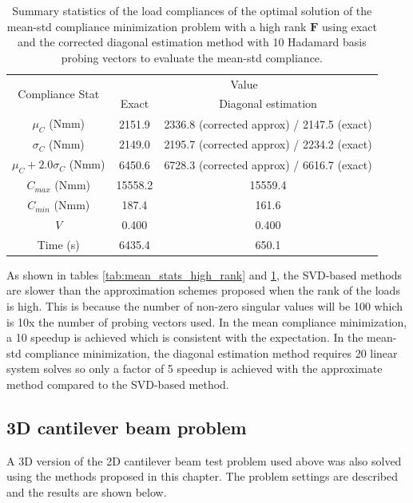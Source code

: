     \begin{table}
     \centering
     \caption{Summary statistics of the load compliances of the optimal solution of the mean-std compliance minimization problem with a high rank $\bm{F}$ using exact and the corrected diagonal estimation method with 10 Hadamard basis probing vectors to evaluate the mean-std compliance.}
     \begin{tabular}{|c|c|c|}
      \hline
      \multirow{2}{5em}{Compliance Stat} & \multicolumn{2}{c|}{Value} \\\cline{2-3}
      & Exact & Diagonal estimation \\
      \hline
      \hline
      $\mu_C$ (Nmm) & 2151.9 & 2336.8 (corrected approx) / 2147.5 (exact) \\
      \hline
      $\sigma_C$ (Nmm) & 2149.0 & 2195.7 (corrected approx) / 2234.2 (exact) \\
      \hline
      $\mu_C + 2.0 \sigma_C$ (Nmm) & 6450.6 & 6728.3 (corrected approx) / 6616.7 (exact) \\
      \hline
      $C_{max}$ (Nmm) & 15558.2 & 15559.4 \\
      \hline
      $C_{min}$ (Nmm) & 187.4 & 161.6 \\
      \hline
      $V$ & 0.400 & 0.400 \\
      \hline
      Time (s) & 6435.4 & 650.1 \\
      \hline
     \end{tabular}
     \label{tab:mean_std_stats_high_rank}
    \end{table}

    As shown in tables \ref{tab:mean_stats_high_rank} and \ref{tab:mean_std_stats_high_rank}, the SVD-based methods are slower than the approximation schemes proposed when the rank of the loads is high. This is because the number of non-zero singular values will be 100 which is 10x the number of probing vectors used. In the mean compliance minimization, a 10 speedup is achieved which is consistent with the expectation. In the mean-std compliance minimization, the diagonal estimation method requires 20 linear system solves so only a factor of 5 speedup is achieved with the approximate method compared to the SVD-based method.
    
\subsection{3D cantilever beam problem}

  A 3D version of the 2D cantilever beam test problem used above was also solved using the methods proposed in this chapter. The problem settings are described and the results are shown below.

